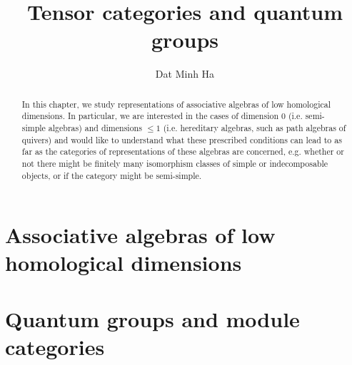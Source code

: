 

\setcounter{section}{-1}





	\title{Tensor categories and quantum groups}
	
	\author{Dat Minh Ha}
	\maketitle
	
	\begin{abstract}
	    
	\end{abstract}
	
	{
      \hypersetup{} 
      \dominitoc
      \tableofcontents %
    }
    
    \chapter{Associative algebras of low homological dimensions}
        \begin{abstract}
            In this chapter, we study representations of associative algebras of low homological dimensions. In particular, we are interested in the cases of dimension $0$ (i.e. semi-simple algebras) and dimensions $\leq 1$ (i.e. hereditary algebras, such as path algebras of quivers) and would like to understand what these prescribed conditions can lead to as far as the categories of representations of these algebras are concerned, e.g. whether or not there might be finitely many isomorphism classes of simple or indecomposable objects, or if the category might be semi-simple. 
        \end{abstract}
        
        \minitoc
        
        
        
        
        
        
        
        
    
    \chapter{Quantum groups and module categories}
        \begin{abstract}
            
        \end{abstract}
        

